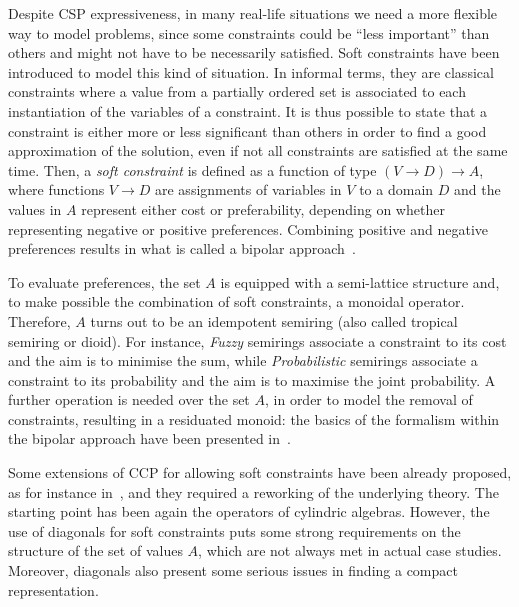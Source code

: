 \documentclass{llncs}
\begin{document}
\smallskip
Despite CSP expressiveness,  
in many real-life situations we need a more flexible way to model problems, 
since some constraints could be ``less important'' than others and might not have to be necessarily satisfied.
%
Soft constraints have been introduced to model this kind of situation. In informal terms, they are classical constraints where a value from a partially ordered set is associated to each instantiation of the variables of a constraint. It is  thus possible to state that a constraint is either  more or less significant than others in order to find a good approximation of the solution, even if not all constraints are satisfied at the same time. 
%
Then, a \emph{soft constraint} is defined as a function of type $(V\to D)\to A$, 
where functions $V\to D$ are assignments of variables in $V$ to a domain $D$ and the values in $A$ represent either cost or preferability, depending on whether representing negative or positive preferences. Combining positive and negative preferences results in what is called a bipolar approach~\cite{posneg}.

To evaluate preferences, the set $A$ is equipped with a semi-lattice structure and, 
to make possible the combination of soft constraints, a monoidal operator. 
Therefore, $A$ turns out to be an idempotent semiring (also called tropical semiring or dioid). 
%
 For instance, \emph{Fuzzy} semirings associate a constraint to its cost and the aim is to minimise the sum,
  while \emph{Probabilistic} semirings associate a constraint to its probability and the aim is to maximise the joint probability.
A further operation is needed over the set $A$, in order to model the removal of constraints, 
resulting in a residuated monoid: the basics of the formalism within the bipolar approach have been presented in~\cite{ipl17}.


\medskip

Some extensions of CCP for allowing soft constraints have been already proposed, as for instance in~\cite{scc}, and they required a reworking of the underlying theory.
The starting point has been again the operators of cylindric algebras. However, the use of diagonals for soft constraints puts some strong requirements on the structure of the set of values $A$, 
which are not always met in actual case studies. Moreover, diagonals also present some serious issues in finding a compact representation.
\end{document}
